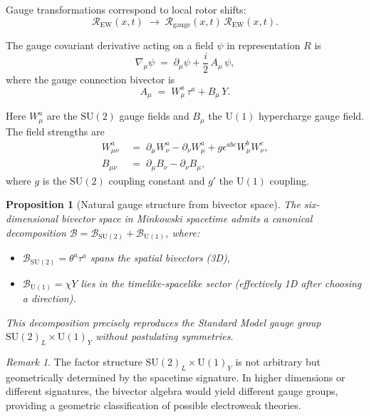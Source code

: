 \documentclass[11pt,a4paper]{article}
\newcommand{\Rotor}{\mathcal{R}}
\newcommand{\Biv}{\mathcal{B}}
\newcommand{\D}{\nabla}                        %
\newcommand{\SU}{\mathrm{SU}}
\newcommand{\U}{\mathrm{U}}
\theoremstyle{definition}
\theoremstyle{plain}
\newtheorem{proposition}{Proposition}
\theoremstyle{remark}
\newtheorem{remark}{Remark}
\begin{document}
Gauge transformations correspond to local rotor shifts:
\begin{equation}
  \Rotor_{\text{EW}}(x,t) \;\to\; \Rotor_{\text{gauge}}(x,t)\, \Rotor_{\text{EW}}(x,t).
\end{equation}

The gauge covariant derivative acting on a field $\psi$ in representation $R$ is
\begin{equation}
  \D_\mu \psi \;=\; \partial_\mu \psi + \frac{i}{2}\,A_\mu\,\psi,
\end{equation}
where the gauge connection bivector is
\begin{equation}
  A_\mu \;=\; W_\mu^a\,\tau^a + B_\mu\,Y.
  \label{eq:gauge-connection}
\end{equation}

Here $W_\mu^a$ are the $\SU(2)$ gauge fields and $B_\mu$ the $\U(1)$ hypercharge gauge field. The field strengths are
\begin{align}
  W_{\mu\nu}^a &\;=\; \partial_\mu W_\nu^a - \partial_\nu W_\mu^a + g\epsilon^{abc}W_\mu^b W_\nu^c, \label{eq:su2-field-strength} \\
  B_{\mu\nu} &\;=\; \partial_\mu B_\nu - \partial_\nu B_\mu, \label{eq:u1-field-strength}
\end{align}
where $g$ is the $\SU(2)$ coupling constant and $g'$ the $\U(1)$ coupling.

\begin{proposition}[Natural gauge structure from bivector space]
The six-dimensional bivector space in Minkowski spacetime admits a canonical decomposition $\Biv = \Biv_{\SU(2)} + \Biv_{\U(1)}$, where:
\begin{itemize}
  \item $\Biv_{\SU(2)} = \theta^a \tau^a$ spans the spatial bivectors (3D),
  \item $\Biv_{\U(1)} = \chi Y$ lies in the timelike-spacelike sector (effectively 1D after choosing a direction).
\end{itemize}
This decomposition precisely reproduces the Standard Model gauge group $\SU(2)_L \times \U(1)_Y$ without postulating symmetries.
\end{proposition}

\begin{remark}
The factor structure $\SU(2)_L \times \U(1)_Y$ is not arbitrary but geometrically determined by the spacetime signature. In higher dimensions or different signatures, the bivector algebra would yield different gauge groups, providing a geometric classification of possible electroweak theories.
\end{remark}
\end{document}
